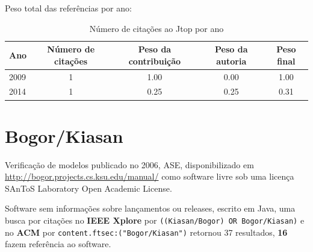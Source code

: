 Peso total das referências por ano:

\begin{table}[h]
\caption{Número de citações ao Jtop por ano}
\centering
\begin{tabular}{| l | c | c | c | c |}
  \hline
  Ano & Número de citações & Peso da contribuição & Peso da autoria & Peso final \\
  \hline
  2009
    & 1
    & 1.00
    & 0.00
    & 1.00 \\
  2014
    & 1
    & 0.25
    & 0.25
    & 0.31 \\
  \hline
\end{tabular}
\end{table}


\section{Bogor/Kiasan}

Verificação de modelos
publicado no 2006, ASE,
disponibilizado em \url{http://bogor.projects.cs.ksu.edu/manual/}
como software livre
sob uma licença SAnToS Laboratory Open Academic License.

Software sem informações sobre lançamentos ou releases,
escrito em Java,
uma busca por citações no {\bf IEEE Xplore} por
\texttt{((Kiasan/Bogor) OR Bogor/Kiasan)}
e no {\bf ACM} por
\texttt{content.ftsec:("Bogor/Kiasan")}
retornou
37 resultados,
{\bf 16} fazem referência ao software.

